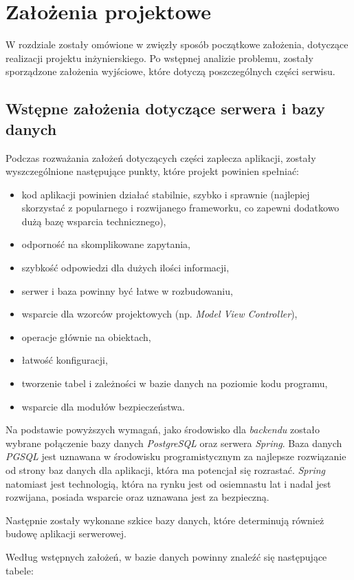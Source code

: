 \documentclass[twoside]{projektInzynierskiMS}
\numberwithin{figure}{section}
\begin{document}
\section{Założenia projektowe}
W rozdziale zostały omówione w zwięzły sposób początkowe założenia, dotyczące realizacji projektu inżynierskiego. Po wstępnej analizie problemu, zostały sporządzone założenia wyjściowe, które dotyczą poszczególnych części serwisu.

\subsection{Wstępne założenia dotyczące serwera i bazy danych}
Podczas rozważania założeń dotyczących części zaplecza aplikacji, zostały wyszczególnione następujące punkty, które projekt powinien spełniać:
\begin{itemize}
\item kod aplikacji powinien działać stabilnie, szybko i sprawnie (najlepiej skorzystać z popularnego i rozwijanego frameworku, co zapewni dodatkowo dużą bazę wsparcia technicznego),
\item odporność na skomplikowane zapytania,
\item szybkość odpowiedzi dla dużych ilości informacji,
\item serwer i baza powinny być łatwe w rozbudowaniu,
\item wsparcie dla wzorców projektowych (np. \textit{Model View Controller}),
\item operacje głównie na obiektach,
\item łatwość konfiguracji,
\item tworzenie tabel i zależności w bazie danych na poziomie kodu programu,
\item wsparcie dla modułów bezpieczeństwa.
\end{itemize}
Na podstawie powyższych wymagań, jako środowisko dla \textit{backendu} zostało wybrane połączenie bazy danych \textit{PostgreSQL} oraz serwera \textit{Spring}. Baza danych \textit{PGSQL} jest uznawana w środowisku programistycznym za najlepsze rozwiązanie od strony baz danych dla aplikacji, która ma potencjał się rozrastać. \textit{Spring} natomiast jest technologią, która na rynku jest od osiemnastu lat i nadal jest rozwijana, posiada wsparcie oraz uznawana jest za bezpieczną.

Następnie zostały wykonane szkice bazy danych, które determinują również budowę aplikacji serwerowej.

Według wstępnych założeń, w bazie danych powinny znaleźć się następujące tabele:
\end{document}
